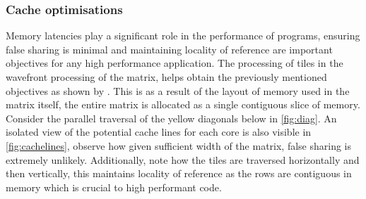 \documentclass[manuscript,screen, nonacm=true]{acmart}
\begin{document}
\subsubsection{Cache optimisations}
Memory latencies play a significant role in the performance of programs, ensuring false sharing is minimal and maintaining locality of reference are important objectives for any high performance application. The processing of tiles in the wavefront processing of the matrix, helps obtain the previously mentioned objectives as shown by \cite{manjikian1996scheduling}. This is as a result of the layout of memory used in the matrix itself, the entire matrix is allocated as a single contiguous slice of memory. Consider the parallel traversal of the yellow diagonals below in \cref{fig:diag}. An isolated view of the potential cache lines for each core is also visible in \cref{fig:cachelines}, observe how given sufficient width of the matrix, false sharing is extremely unlikely. Additionally, note how the tiles are traversed horizontally and then vertically, this maintains locality of reference as the rows are contiguous in memory which is crucial to high performant code. 
\end{document}
